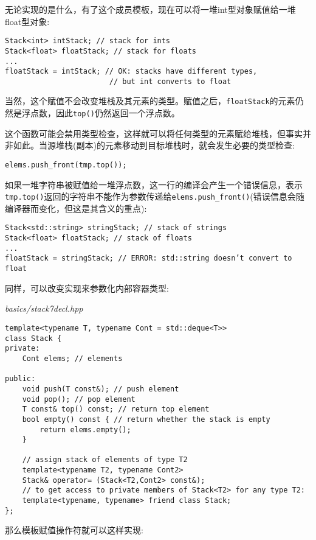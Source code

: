 无论实现的是什么，有了这个成员模板，现在可以将一堆int型对象赋值给一堆float型对象:

\begin{lstlisting}[style=styleCXX]
Stack<int> intStack; // stack for ints
Stack<float> floatStack; // stack for floats
...
floatStack = intStack; // OK: stacks have different types,
						// but int converts to float
\end{lstlisting}

当然，这个赋值不会改变堆栈及其元素的类型。赋值之后，\texttt{floatStack}的元素仍然是浮点数，因此\texttt{top()}仍然返回一个浮点数。

这个函数可能会禁用类型检查，这样就可以将任何类型的元素赋给堆栈，但事实并非如此。当源堆栈(副本)的元素移动到目标堆栈时，就会发生必要的类型检查:

\begin{lstlisting}[style=styleCXX]
elems.push_front(tmp.top());
\end{lstlisting}

如果一堆字符串被赋值给一堆浮点数，这一行的编译会产生一个错误信息，表示\texttt{tmp.top()}返回的字符串不能作为参数传递给\texttt{elems.push\_front()}(错误信息会随编译器而变化，但这是其含义的重点):

\begin{lstlisting}[style=styleCXX]
Stack<std::string> stringStack; // stack of strings
Stack<float> floatStack; // stack of floats
...
floatStack = stringStack; // ERROR: std::string doesn’t convert to float
\end{lstlisting}

同样，可以改变实现来参数化内部容器类型:

\noindent
\textit{basics/stack7decl.hpp}
\begin{lstlisting}[style=styleCXX]
template<typename T, typename Cont = std::deque<T>>
class Stack {
private:
	Cont elems; // elements
	
public:
	void push(T const&); // push element
	void pop(); // pop element
	T const& top() const; // return top element
	bool empty() const { // return whether the stack is empty
		return elems.empty();
	}

	// assign stack of elements of type T2
	template<typename T2, typename Cont2>
	Stack& operator= (Stack<T2,Cont2> const&);
	// to get access to private members of Stack<T2> for any type T2:
	template<typename, typename> friend class Stack;
};
\end{lstlisting}

那么模板赋值操作符就可以这样实现:

